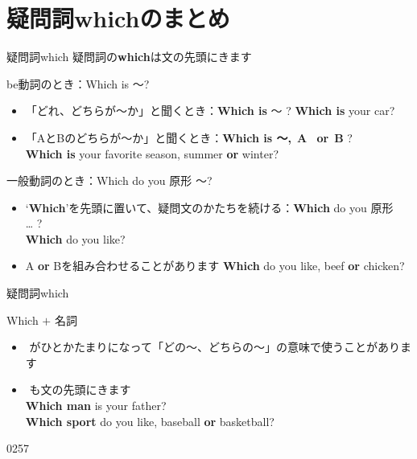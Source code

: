 \documentclass[aspectratio=169,xcolor={dvipsnames,table}]{beamer}
\begin{document}
\section{疑問詞whichのまとめ}
\begin{frame}[plain]{疑問詞which }\small
 疑問詞の{\bfseries which}は文の先頭にきます
\begin{block}{be動詞のとき：Which is ～?}
\small
\begin{itemize}[square]\small
 \item 「どれ、どちらが～か」と聞くとき：{\bfseries Which is}   〜 ?%
\hfill{}{\bfseries Which is} your car?
 \item 「AとBのどちらが～か」と聞くとき：{\bfseries Which is 〜,\,\,\,A \myRisingPitch\,\,\,or\,\,\,B \myDownwardPitch} ?\\
\hfill{}{\bfseries Which is} your favorite season, summer {\bfseries or} winter?
\end{itemize}
     \end{block}

\begin{block}{一般動詞のとき：Which do you 原形 ～?}
\begin{itemize}[square]\small
 \item `{\bfseries Which}'を先頭に置いて、疑問文のかたちを続ける：{\bfseries Which} do you  原形 \ldots\,\,?\\
\hfill{}{\bfseries Which} do you like?
 \item A {\bfseries or} Bを組み合わせることがあります%
\hfill{}{\bfseries Which} do you like, beef {\bfseries or} chicken?
\end{itemize}
     \end{block}
\end{frame}
\begin{frame}[plain]{疑問詞which }\small

\begin{block}{Which $+$ 名詞}\small
\begin{itemize}[square]\small
 \item {}\,\,がひとかたまりになって「どの〜、どちらの～」の意味で使うことがあります
 \item {}\,\,も文の先頭にきます\\%
\hfill{}{\bfseries Which man} is your father?\\
\hfill{}{\bfseries Which sport} do you like, baseball {\bfseries or} basketball?\\
\hfill{}
\end{itemize}
     \end{block}

\mbox{}\hfill{\tiny 0257}\,{\scriptsize {}}

\end{frame}
\end{document}
